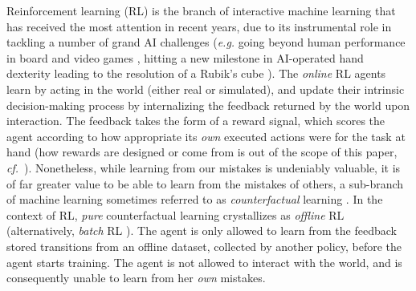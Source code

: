 Reinforcement learning (RL) \cite{Sutton1998-ow}
is the branch of interactive machine learning
that has received the most attention in recent years, due to
its instrumental role in tackling a number of grand AI challenges
(\textit{e.g.} going beyond human performance in
board and video games \cite{Mnih2013-rb, Mnih2015-iy, Silver2017-xo, Silver2016-my, Vinyals2019-vx, OpenAI2019-xy},
hitting a new milestone in AI-operated hand dexterity leading
to the resolution of a Rubik's cube \cite{OpenAI2019-vy}).
The \emph{online} RL agents learn by acting in the world (either real or simulated),
and update their intrinsic decision-making process by
internalizing the feedback returned by the world upon interaction.
The feedback takes the form of a reward signal,
which scores the agent according to how appropriate its \emph{own} executed actions were for the task at hand
(how rewards are designed or come from is out of the scope of this paper,
\textit{cf.}~\cite{Singh2009-cm}).
Nonetheless, while learning from our mistakes is undeniably valuable, it is of far greater
value to be able to learn from the mistakes of others,
a sub-branch of machine learning sometimes referred to as \emph{counterfactual} learning
\cite{Bottou2013-so}.
In the context of RL, \emph{pure}
counterfactual learning crystallizes as \emph{offline} RL \cite{Levine2020-hz}
(alternatively, \emph{batch} RL \cite{Lange2012-cc}).
The agent is only allowed to learn from the feedback stored transitions
from an offline dataset, collected by another policy, before the agent starts training.
The agent is not allowed to interact with the world, and is consequently unable to learn from her \emph{own} mistakes.

